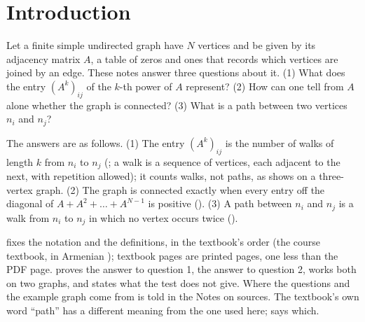 \section{Introduction}\label{sec:introduction}

Let a finite simple undirected graph have $N$ vertices and be given by its adjacency matrix $A$, a table of zeros and ones that records which vertices are joined by an edge. These notes answer three questions about it. (1) What does the entry $(A^k)_{ij}$ of the $k$-th power of $A$ represent? (2) How can one tell from $A$ alone whether the graph is connected? (3) What is a path between two vertices $n_i$ and $n_j$?

The answers are as follows. (1) The entry $(A^k)_{ij}$ is the number of walks of length $k$ from $n_i$ to $n_j$ (; a walk is a sequence of vertices, each adjacent to the next, with repetition allowed); it counts walks, not paths, as  shows on a three-vertex graph. (2) The graph is connected exactly when every entry off the diagonal of $A + A^2 + \dots + A^{N-1}$ is positive (). (3) A path between $n_i$ and $n_j$ is a walk from $n_i$ to $n_j$ in which no vertex occurs twice ().

 fixes the notation and the definitions, in the textbook's order (the course textbook, in Armenian \cite{petrosyan_graph_theory}); textbook pages are printed pages, one less than the PDF page.  proves the answer to question 1,  the answer to question 2,  works both on two graphs, and  states what the test does not give. Where the questions and the example graph come from is told in the Notes on sources. The textbook's own word ``path'' has a different meaning from the one used here;  says which.
